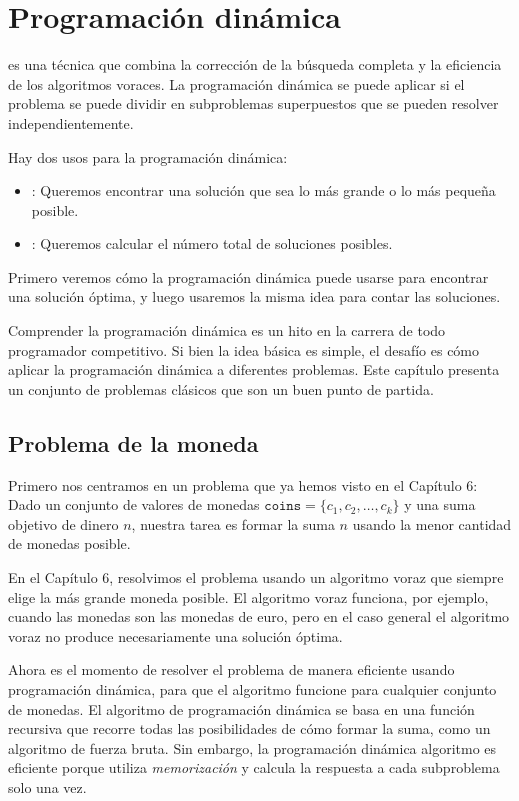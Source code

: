 \chapter{Programación dinámica}


es una técnica que combina la corrección
de la búsqueda completa y la eficiencia
de los algoritmos voraces.
La programación dinámica se puede aplicar si el
problema se puede dividir en subproblemas superpuestos
que se pueden resolver independientemente.

Hay dos usos para la programación dinámica:

\begin{itemize}
\item
{}:
Queremos encontrar una solución que sea
lo más grande o lo más pequeña posible.
\item
{}:
Queremos calcular el número total de
soluciones posibles.
\end{itemize}

Primero veremos cómo la programación dinámica puede
usarse para encontrar una solución óptima,
y luego usaremos la misma idea para
contar las soluciones.

Comprender la programación dinámica es un hito
en la carrera de todo programador competitivo.
Si bien la idea básica es simple,
el desafío es cómo aplicar
la programación dinámica a diferentes problemas.
Este capítulo presenta un conjunto de problemas clásicos
que son un buen punto de partida.

\section{Problema de la moneda}

Primero nos centramos en un problema que ya
hemos visto en el Capítulo 6:
Dado un conjunto de valores de monedas $\texttt{coins} = \{c_1,c_2,\ldots,c_k\}$
y una suma objetivo de dinero $n$, nuestra tarea es
formar la suma $n$ usando la menor cantidad de monedas posible.

En el Capítulo 6, resolvimos el problema usando un
algoritmo voraz que siempre elige la más grande
moneda posible.
El algoritmo voraz funciona, por ejemplo,
cuando las monedas son las monedas de euro,
pero en el caso general el algoritmo voraz
no produce necesariamente una solución óptima.

Ahora es el momento de resolver el problema de manera eficiente
usando programación dinámica, para que el algoritmo
funcione para cualquier conjunto de monedas.
El algoritmo de programación dinámica
se basa en una función recursiva
que recorre todas las posibilidades de cómo
formar la suma, como un algoritmo de fuerza bruta.
Sin embargo, la programación dinámica
algoritmo es eficiente porque
utiliza \emph{memorización} y
calcula la respuesta a cada subproblema solo una vez.

